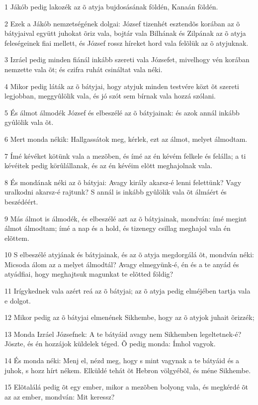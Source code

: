 \par 1 Jákób pedig lakozék az õ atyja bujdosásának földén, Kanaán földén.
\par 2 Ezek a Jákób nemzetségének dolgai: József tizenhét esztendõs korában az õ bátyjaival együtt juhokat õriz vala, bojtár vala Bilhának és Zilpának az õ atyja feleségeinek fiai mellett, és József rossz híreket hord vala felõlük az õ atyjuknak.
\par 3 Izráel pedig minden fiánál inkább szereti vala Józsefet, mivelhogy vén korában nemzette vala õt; és czifra ruhát csináltat vala néki.
\par 4 Mikor pedig láták az õ bátyjai, hogy atyjuk minden testvére közt õt szereti legjobban, meggyûlölik vala, és jó szót sem bírnak vala hozzá szólani.
\par 5 És álmot álmodék József és elbeszélé az õ bátyjainak: és azok annál inkább gyûlölik vala õt.
\par 6 Mert monda nékik: Hallgassátok meg, kérlek, ezt az álmot, melyet álmodtam.
\par 7 Ímé kévéket kötünk vala a mezõben, és ímé az én kévém felkele és felálla; a ti kévéitek pedig körûlállanak, és az én kévéim elõtt meghajolnak vala.
\par 8 És mondának néki az õ bátyjai: Avagy király akarsz-é lenni felettünk? Vagy uralkodni akarsz-é rajtunk? S annál is inkább gyûlölik vala õt álmáért és beszédéért.
\par 9 Más álmot is álmodék, és elbeszélé azt az õ bátyjainak, mondván: ímé megint álmot álmodtam; ímé a nap és a hold, és tizenegy csillag meghajol vala én elõttem.
\par 10 S elbeszélé atyjának és bátyjainak, és az õ atyja megdorgálá õt, mondván néki: Micsoda álom az a melyet álmodtál? Avagy elmegyünk-é, én és a te anyád és atyádfiai, hogy meghajtsuk magunkat te elõtted földig?
\par 11 Irígykednek vala azért reá az õ bátyjai; az õ atyja pedig elméjében tartja vala e dolgot.
\par 12 Mikor pedig az õ bátyjai elmenének Sikhembe, hogy az õ atyjok juhait õrizzék;
\par 13 Monda Izráel Józsefnek: A te bátyáid avagy nem Sikhemben legeltetnek-é? Jöszte, és én hozzájok küldelek téged. Õ pedig monda: Ímhol vagyok.
\par 14 És monda néki: Menj el, nézd meg, hogy s mint vagynak a te bátyáid és a juhok, s hozz hírt nékem. Elküldé tehát õt Hebron völgyébõl, és méne Sikhembe.
\par 15 Elõtalálá pedig õt egy ember, mikor a mezõben bolyong vala, és megkérdé õt az az ember, mondván: Mit keressz?
